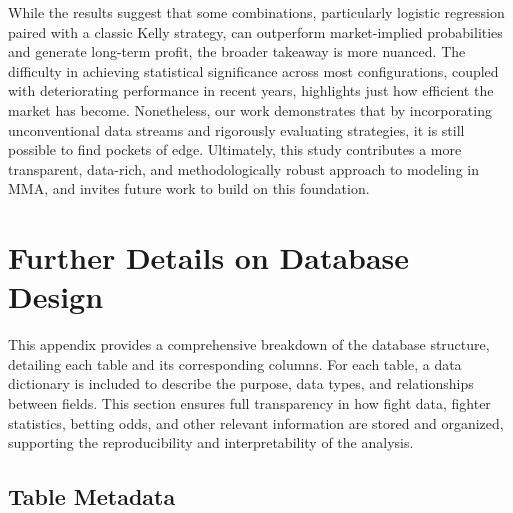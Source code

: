\documentclass[12pt,twoside]{report}
\begin{document}
While the results suggest that some combinations, particularly logistic regression paired with a classic Kelly strategy, can outperform market-implied probabilities and generate long-term profit, the broader takeaway is more nuanced. The difficulty in achieving statistical significance across most configurations, coupled with deteriorating performance in recent years, highlights just how efficient the market has become. Nonetheless, our work demonstrates that by incorporating unconventional data streams and rigorously evaluating strategies, it is still possible to find pockets of edge. Ultimately, this study contributes a more transparent, data-rich, and methodologically robust approach to modeling in MMA, and invites future work to build on this foundation.




\appendix
\chapter{Further Details on Database Design}

This appendix provides a comprehensive breakdown of the database structure, detailing each table and its corresponding columns. For each table, a data dictionary is included to describe the purpose, data types, and relationships between fields. This section ensures full transparency in how fight data, fighter statistics, betting odds, and other relevant information are stored and organized, supporting the reproducibility and interpretability of the analysis.


\section{Table Metadata}
\end{document}

